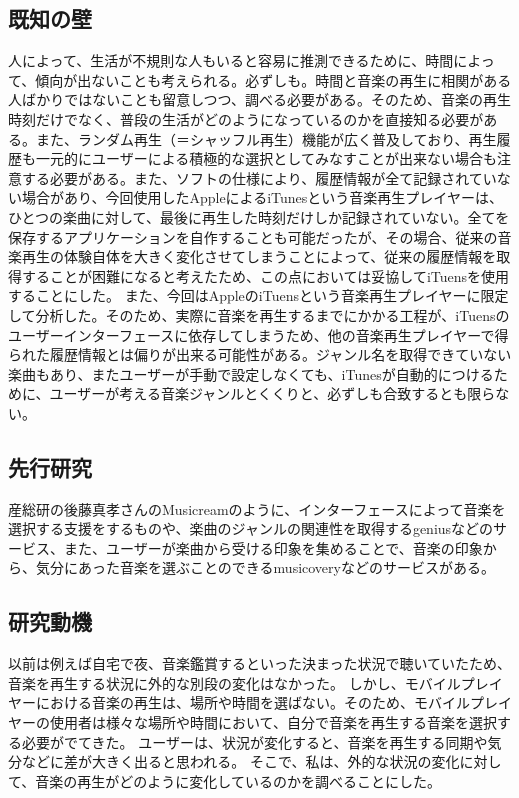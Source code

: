 \documentclass{jsarticle}
\begin{document}
\subsection{既知の壁}
人によって、生活が不規則な人もいると容易に推測できるために、時間によって、傾向が出ないことも考えられる。必ずしも。時間と音楽の再生に相関がある人ばかりではないことも留意しつつ、調べる必要がある。そのため、音楽の再生時刻だけでなく、普段の生活がどのようになっているのかを直接知る必要がある。また、ランダム再生（＝シャッフル再生）機能が広く普及しており、再生履歴も一元的にユーザーによる積極的な選択としてみなすことが出来ない場合も注意する必要がある。また、ソフトの仕様により、履歴情報が全て記録されていない場合があり、今回使用したAppleによるiTunesという音楽再生プレイヤーは、ひとつの楽曲に対して、最後に再生した時刻だけしか記録されていない。全てを保存するアプリケーションを自作することも可能だったが、その場合、従来の音楽再生の体験自体を大きく変化させてしまうことによって、従来の履歴情報を取得することが困難になると考えたため、この点においては妥協してiTuensを使用することにした。
また、今回はAppleのiTuensという音楽再生プレイヤーに限定して分析した。そのため、実際に音楽を再生するまでにかかる工程が、iTuensのユーザーインターフェースに依存してしまうため、他の音楽再生プレイヤーで得られた履歴情報とは偏りが出来る可能性がある。ジャンル名を取得できていない楽曲もあり、またユーザーが手動で設定しなくても、iTunesが自動的につけるために、ユーザーが考える音楽ジャンルとくくりと、必ずしも合致するとも限らない。
\subsection{先行研究}
産総研の後藤真孝さんのMusicreamのように、インターフェースによって音楽を選択する支援をするものや、楽曲のジャンルの関連性を取得するgeniusなどのサービス、また、ユーザーが楽曲から受ける印象を集めることで、音楽の印象から、気分にあった音楽を選ぶことのできるmusicoveryなどのサービスがある。

\subsection{研究動機}

以前は例えば自宅で夜、音楽鑑賞するといった決まった状況で聴いていたため、音楽を再生する状況に外的な別段の変化はなかった。
しかし、モバイルプレイヤーにおける音楽の再生は、場所や時間を選ばない。そのため、モバイルプレイヤーの使用者は様々な場所や時間において、自分で音楽を再生する音楽を選択する必要がでてきた。
ユーザーは、状況が変化すると、音楽を再生する同期や気分などに差が大きく出ると思われる。
そこで、私は、外的な状況の変化に対して、音楽の再生がどのように変化しているのかを調べることにした。
\end{document}
